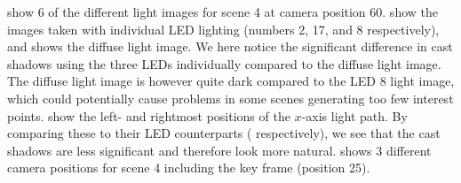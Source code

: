 \documentclass[thesis.tex]{subfiles}
\begin{document}
 show 6 of the different light images for scene 4 at camera position 60.  show the images taken with individual LED lighting (numbers 2, 17, and 8 respectively), and  shows the diffuse light image. We here notice the significant difference in cast shadows using the three LEDs individually compared to the diffuse light image. The diffuse light image is however quite dark compared to the LED 8 light image, which could potentially cause problems in some scenes generating too few interest points.
 show the left- and rightmost positions of the $x$-axis light path. By comparing these to their LED counterparts ( respectively), we see that the cast shadows are less significant and therefore look more natural.
 shows 3 different camera positions for scene 4 including the key frame (position 25).
%
\end{document}
